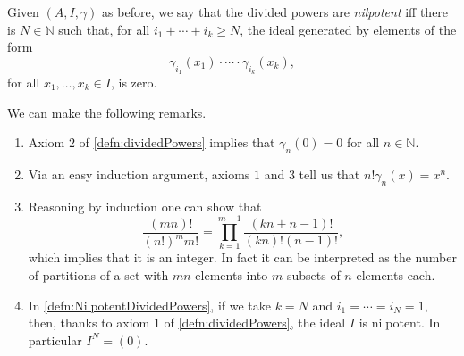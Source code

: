 \begin{defn}\label{defn:NilpotentDividedPowers}
	Given $\left(A, I, \gamma\right)$ as before, we say that the divided
	powers are {\em nilpotent} iff there is $N \in \mathbb{N}$ such that,
	for all $i_1 + \cdots + i_k \geq N$,
	the ideal generated by elements of the form
	\begin{equation*}
		\gamma_{i_1}(x_1) \cdot \cdots \cdot \gamma_{i_k}(x_k)
	,\end{equation*}
	for all $x_1, \ldots, x_k \in I$,
	is zero.
\end{defn}


\begin{rem}[]
	We can make the following remarks.
\begin{enumerate}
\item Axiom $2$ of \cref{defn:dividedPowers}
	implies that $\gamma_n(0) = 0$ for all $n \in \mathbb{N}$.

\item Via an easy induction argument, axioms $1$ and $3$ tell us that
	$n! \gamma_n(x) = x^n$.

\item Reasoning by induction one can show that
	\begin{equation*}
		\frac{\left( mn \right)!}{\left( n! \right)^m m!} =
		\prod_{k=1}^{m-1} \frac{\left( kn + n - 1 \right)!}{(kn)! (n-1)!}
	,\end{equation*}
	which implies that it is an integer.
	In fact it can be interpreted as the number of partitions of a set with $mn$
	elements into $m$ subsets of $n$ elements each.

\item In \cref{defn:NilpotentDividedPowers},
	if we take $k = N$ and $i_1 = \cdots = i_N = 1$,
	then, thanks to axiom $1$ of \cref{defn:dividedPowers}, the ideal $I$
	is nilpotent.
	In particular $I^N = (0)$.
\end{enumerate}
\end{rem}


